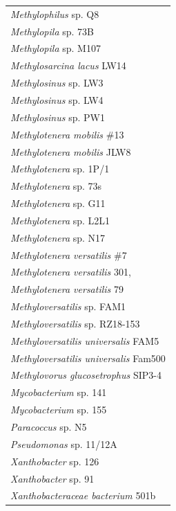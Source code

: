 \begin{singlespace}
\begin{longtable}{p{}}
                 \textit{Methylophilus} sp. Q8 \\
                  \textit{Methylopila} sp. 73B \\
                 \textit{Methylopila} sp. M107 \\
            \textit{Methylosarcina lacus} LW14 \\
                 \textit{Methylosinus} sp. LW3 \\
                 \textit{Methylosinus} sp. LW4 \\
                 \textit{Methylosinus} sp. PW1 \\
            \textit{Methylotenera mobilis} \#13 \\
           \textit{Methylotenera mobilis} JLW8 \\
               \textit{Methylotenera} sp. 1P/1 \\
                \textit{Methylotenera} sp. 73s \\
                \textit{Methylotenera} sp. G11 \\
               \textit{Methylotenera} sp. L2L1 \\
                \textit{Methylotenera} sp. N17 \\
          \textit{Methylotenera versatilis} \#7 \\
        \textit{Methylotenera versatilis} 301, \\
          \textit{Methylotenera versatilis} 79 \\
           \textit{Methyloversatilis} sp. FAM1 \\
       \textit{Methyloversatilis} sp. RZ18-153 \\
   \textit{Methyloversatilis universalis} FAM5 \\
 \textit{Methyloversatilis universalis} Fam500 \\
   \textit{Methylovorus glucosetrophus} SIP3-4 \\
                \textit{Mycobacterium} sp. 141 \\
                \textit{Mycobacterium} sp. 155 \\
                    \textit{Paracoccus} sp. N5 \\
               \textit{Pseudomonas} sp. 11/12A \\
                 \textit{Xanthobacter} sp. 126 \\
                  \textit{Xanthobacter} sp. 91 \\
     \textit{Xanthobacteraceae bacterium} 501b \\
\midrule
\end{longtable}
\end{singlespace}


